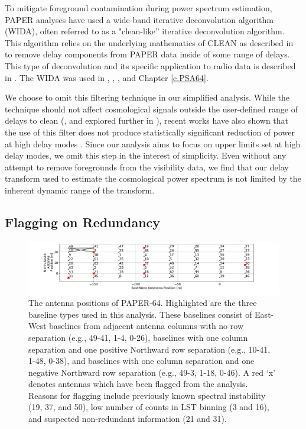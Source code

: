 To mitigate foreground contamination during
power spectrum estimation, PAPER analyses have used
a wide-band iterative deconvolution algorithm (WIDA),
often referred to as a "clean-like'' iterative
deconvolution algorithm. This algorithm relies on the
underlying mathematics of CLEAN as described in
\citet{hogbom1974} to remove delay components from
PAPER data inside of some range of delays.
This type of deconvolution and its specific
application to radio data is described in \citet{parsons_backer2009}.
The WIDA was used in \citet{parsons_et_al2012b,parsons_et_al2014,jacobs_et_al2015}, , \citet{kerrigan_et_al2018}, and Chapter \ref{c.PSA64}.

We choose to omit this filtering technique in our simplified analysis. While the technique should not
affect cosmological signals outside the user-defined
range of delays to clean (\citealt{parsons_backer2009, parsons_et_al2012b, parsons_et_al2014}, and explored further in \citealt{kerrigan_et_al2018}),
recent works have also shown that the use of this filter does not produce
statistically significant reduction of power at
high delay modes \citep{kerrigan_et_al2018}.
Since our analysis aims to focus on upper limits set
at high delay modes, we omit this step in the interest
of simplicity. Even without any attempt to remove foregrounds from the
visibility data, we find that our delay transform used to estimate
the cosmological power spectrum is not limited by the inherent
dynamic range of the transform.

\subsection{Flagging on Redundancy}
\label{sec:redundancy}

\begin{figure}[tp]
\centering
\includegraphics[trim={3cm 0  4cm 0},width=\textwidth]{plots/psa64_antpos_flagged.pdf}
\caption{The antenna positions of PAPER-64.
Highlighted are the three baseline types used in this analysis.
These baselines consist of East-West baselines from adjacent
antenna columns with no row separation
(e.g., 49-41, 1-4, 0-26),
baselines with one column separation and one positive Northward
row separation (e.g., 10-41, 1-48, 0-38),
and baselines with one column separation
and one negative Northward row separation
(e.g., 49-3, 1-18, 0-46). A red `x' denotes antennas which have been flagged from the analysis. Reasons for
flagging include previously known spectral instability (19, 37, and 50), low number of counts in LST binning (3 and 16), and suspected non-redundant information (21 and 31).} \label{fig:ant_pos}
\end{figure}

